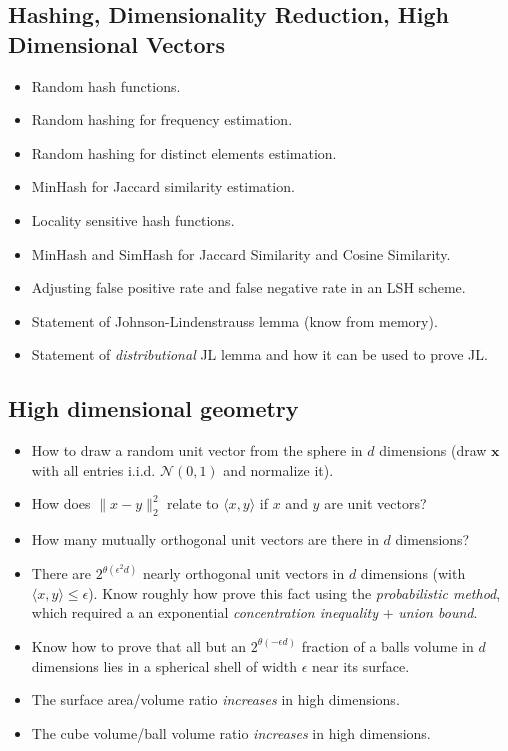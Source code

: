 \documentclass[10pt]{article}
\newcommand{\bv}[1]{\mathbf{#1}}
\begin{document}
\subsection{Hashing, Dimensionality Reduction, High Dimensional Vectors}
\begin{itemize}
	\item Random hash functions.
	\item Random hashing for frequency estimation. 
	\item Random hashing for distinct elements estimation.
	\item MinHash for Jaccard similarity estimation. 
	\item Locality sensitive hash functions. 
	\item MinHash and SimHash for Jaccard Similarity and Cosine Similarity.
	\item Adjusting false positive rate and false negative rate in an LSH scheme. 
	\item Statement of Johnson-Lindenstrauss lemma (know from memory).
	\item Statement of \emph{distributional} JL lemma and how it can be used to prove JL.
\end{itemize}

\subsection{High dimensional geometry}
\begin{itemize}
	\item How to draw a random unit vector from the sphere in $d$ dimensions (draw $\bv{x}$ with all entries i.i.d. $\mathcal{N}(0,1)$ and normalize it). 
	\item How does $\|x - y\|_2^2$ relate to $\langle x, y\rangle$ if $x$ and $y$ are unit vectors?
	\item How many mutually orthogonal unit vectors are there in $d$ dimensions?
	\item There are $2^{\theta(\epsilon^2d)}$ nearly orthogonal unit vectors in $d$ dimensions (with $\langle x,  y\rangle \leq \epsilon$). Know roughly how prove this fact using the \emph{probabilistic method}, which required a an exponential \emph{concentration inequality} + \emph{union bound}.
	\item Know how to prove that all but an $2^{\theta(-\epsilon d)}$ fraction of a balls volume in $d$ dimensions lies in a spherical shell of width $\epsilon$ near its surface.
	\item The surface area/volume ratio \emph{increases} in high dimensions. 
	\item The cube volume/ball volume ratio \emph{increases} in high dimensions.
	
\end{itemize}
\end{document}
